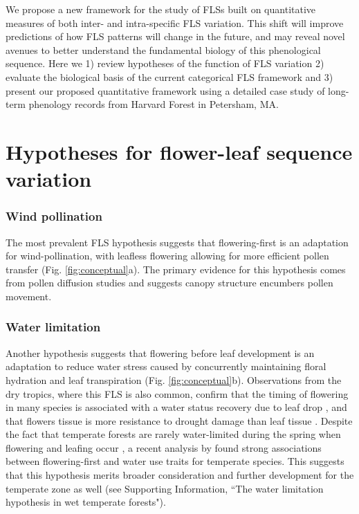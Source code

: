 \documentclass[11pt]{article}
\begin{document}
\noindent We propose a new framework for the study of FLSs built on quantitative measures of both inter- and intra-specific FLS variation. This shift will improve predictions of how FLS patterns will change in the future, and  may reveal novel avenues to better understand the fundamental biology of this phenological sequence. Here we 1) review hypotheses of the function of FLS variation 2) evaluate the biological basis of the current categorical FLS framework and 3) present our proposed quantitative framework using a detailed case study of long-term phenology records from Harvard Forest in Petersham, MA.

\section*{Hypotheses for flower-leaf sequence variation}
\subsubsection*{ Wind pollination}
\noindent The most prevalent FLS hypothesis suggests that flowering-first is an adaptation for wind-pollination, with leafless flowering allowing for more efficient pollen transfer \citep{Whitehead1969}(Fig. \ref{fig:conceptual}a). The primary evidence for this hypothesis comes from pollen diffusion studies \citep[e.g., particle movement through closed and open canopies,][]{Niklas1985, Milleron2012} and suggests canopy structure encumbers pollen movement. %
\subsubsection*{Water limitation}
\noindent Another hypothesis suggests that flowering before leaf development is an adaptation to reduce water stress caused by concurrently maintaining floral hydration and leaf transpiration \citep{Franklin2016} (Fig. \ref{fig:conceptual}b). Observations from the dry tropics, where this FLS is also common, confirm that the timing of flowering in many species is associated with a water status recovery due to leaf drop \citep{Borchert1983,Reich1984}, and that flowers tissue is more resistance to drought damage than leaf tissue \citep{Zhang2017}. Despite the fact that temperate forests are rarely water-limited during the spring when flowering and leafing occur \citep{Polgar2011}, a recent analysis by \citet{Gougherty2018} found strong associations between flowering-first and water use traits for temperate species. This suggests that this hypothesis merits broader consideration and further development for the temperate zone as well (see Supporting Information, ``The water limitation hypothesis in wet temperate forests"). %
 
\end{document}
